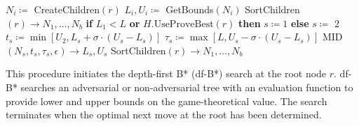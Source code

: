\begin{algorithm}[p]
\begin{algorithmic}[1]
\State $N_i\coloneqq$ CreateChildren$\left(r\right)$
\State $L_i,U_i \coloneqq$ GetBounds$\left(N_i\right)$
\State SortChildren$\left(r\right)\to N_1,\dots,N_b$
    \State \textbf{if} $L_1 < L$ \textbf{or} $H.\text{UseProveBest}\left(r\right)$ \textbf{then} $s \coloneqq 1$
    \State \textbf{else} $s \coloneqq$ 2
    \State $t_s \coloneqq \min\left[U_2, L_s+\sigma\cdot\left(U_s-L_s\right)\right]$
    \State $\tau_s \coloneqq \max\left[L, U_s-\sigma\cdot\left(U_s-L_s\right)\right]$
    \State MID$\left(N_s, t_s, \tau_s, \epsilon\right) \to L_s,U_s$
    \State SortChildren$\left(r\right)\to N_1,\dots,N_b$
\EndWhile
\end{algorithmic}
\caption{df-B*$\left(r,\sigma,\epsilon,H\right)$}
This procedure initiates the depth-first B* (df-B*) search at the root node $r$. df-B* searches an adversarial or non-adversarial tree with an evaluation function to provide lower and upper bounds on the game-theoretical value. The search terminates when the optimal next move at the root has been determined.
\label{alg:dfBstar}
\end{algorithm}

